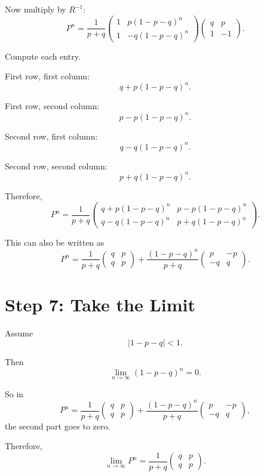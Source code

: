 \documentclass[12pt,a4paper]{article}
\theoremstyle{notestyle}
\begin{document}
Now multiply by $R^{-1}$:
\[
P^n
=
\frac{1}{p+q}
\begin{pmatrix}
1 & p(1-p-q)^n\\
1 & -q(1-p-q)^n
\end{pmatrix}
\begin{pmatrix}
q & p\\
1 & -1
\end{pmatrix}.
\]

Compute each entry.

First row, first column:
\[
q+p(1-p-q)^n.
\]

First row, second column:
\[
p-p(1-p-q)^n.
\]

Second row, first column:
\[
q-q(1-p-q)^n.
\]

Second row, second column:
\[
p+q(1-p-q)^n.
\]

Therefore,
\[
P^n
=
\frac{1}{p+q}
\begin{pmatrix}
q+p(1-p-q)^n & p-p(1-p-q)^n\\
q-q(1-p-q)^n & p+q(1-p-q)^n
\end{pmatrix}.
\]

This can also be written as
\[
P^n
=
\frac{1}{p+q}
\begin{pmatrix}
q & p\\
q & p
\end{pmatrix}
+
\frac{(1-p-q)^n}{p+q}
\begin{pmatrix}
p & -p\\
-q & q
\end{pmatrix}.
\]

\section{Step 7: Take the Limit}

Assume
\[
|1-p-q|<1.
\]

Then
\[
\lim_{n\to\infty}(1-p-q)^n=0.
\]

So in
\[
P^n
=
\frac{1}{p+q}
\begin{pmatrix}
q & p\\
q & p
\end{pmatrix}
+
\frac{(1-p-q)^n}{p+q}
\begin{pmatrix}
p & -p\\
-q & q
\end{pmatrix},
\]
the second part goes to zero.

Therefore,
\[
\lim_{n\to\infty}P^n
=
\frac{1}{p+q}
\begin{pmatrix}
q & p\\
q & p
\end{pmatrix}.
\]
\end{document}

